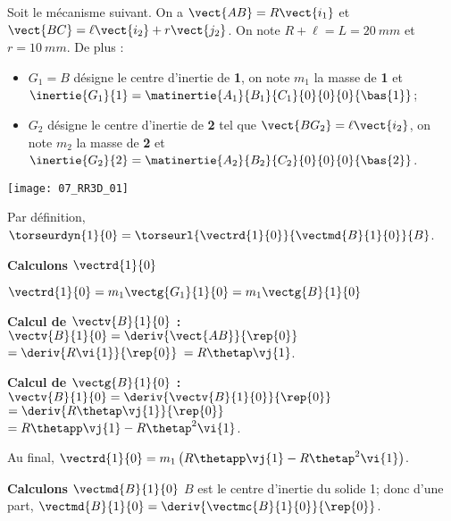 \normalfalse \difficiletrue \tdifficilefalse
\correctiontrue


\setcounter{question}{0}
\ifcorrection
\else
{}
\fi

\ifprof
\else
Soit le mécanisme suivant. On a $\vect{AB}=R\vect{i_1}$ et $\vect{BC}=\ell\vect{i_2}+r\vect{j_2}$. On note $R+\ell=L = \SI{20}{mm}$ et $r=\SI{10}{mm}$. De plus :
\begin{itemize}
\item $G_1=B$ désigne le centre d'inertie de \textbf{1}, on note $m_1$ la masse de \textbf{1} et $\inertie{G_1}{1}=\matinertie{A_1}{B_1}{C_1}{0}{0}{0}{\bas{1}}$; 
\item $G_2$ désigne le centre d'inertie de \textbf{2} tel que  $\vect{BG_2}=\ell\vect{i_2}$, on note $m_2$ la masse de \textbf{2} et $\inertie{G_2}{2}=\matinertie{A_2}{B_2}{C_2}{0}{0}{0}{\bas{2}}$.
\end{itemize}
\begin{center}
\texttt{[image: 07\_RR3D\_01]}
\end{center}
\fi

\ifprof

Par définition, $\torseurdyn{1}{0} = \torseurl{\vectrd{1}{0}}{\vectmd{B}{1}{0}}{B}$.

\textbf{Calculons $\vectrd{1}{0}$}

$\vectrd{1}{0} = m_1\vectg{G_1}{1}{0}=m_1 \vectg{B}{1}{0} $

 \textbf{Calcul de $\vectv{B}{1}{0}$ : }  
$\vectv{B}{1}{0}=\deriv{\vect{AB}}{\rep{0}}$ 
$=\deriv{ R\vi{1}}{\rep{0}}$  
$= R\thetap \vj{1}$.


 \textbf{Calcul de $\vectg{B}{1}{0}$ : }  
$\vectv{B}{1}{0}=\deriv{\vectv{B}{1}{0}}{\rep{0}}$ 
$=\deriv{ R\thetap \vj{1}}{\rep{0}}$  
$=  R\thetapp \vj{1}-R\thetap^2 \vi{1}$.

Au final, $\vectrd{1}{0}= m_1\left(R\thetapp \vj{1}-R\thetap^2 \vi{1}\right)$.
\vspace{.5cm}

\textbf{Calculons $\vectmd{B}{1}{0}$}
$B$ est le centre d'inertie du solide 1; donc 
 d'une part, $\vectmd{B}{1}{0} = \deriv{\vectmc{B}{1}{0} }{\rep{0}}$.
 
